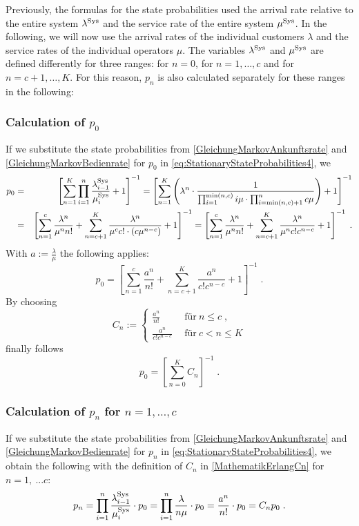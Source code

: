 \documentclass[a4paper,11pt,oneside]{article}
\theoremstyle{definition}
\begin{document}
Previously, the formulas for the state probabilities used the arrival rate relative to the entire system $\lambda^{\rm Sys}$ and the service rate of the entire system $\mu^{\rm Sys}$. In the following, we will now use the arrival rates of the individual customers $\lambda$ and the service rates of the individual operators $\mu$. The variables $\lambda^{\rm Sys}$ and $\mu^{\rm Sys}$ are defined differently for three ranges: for $n=0$, for $n=1,\ldots,c$ and for $n=c+1,\ldots,K$. For this reason, $p_n$ is also calculated separately for these ranges in the following:

\subsubsection*{Calculation of $p_0$}

If we substitute the state probabilities from \eqref{GleichungMarkovAnkunftsrate} and \eqref{GleichungMarkovBedienrate} for $p_0$ in \eqref{eq:StationaryStateProbabilities4}, we
\begin{eqnarray*}
p_0&=&
\left[\sum_{n=1}^K\prod_{i=1}^n\frac{\lambda_{i-1}^{\rm Sys}}{\mu_i^{\rm Sys}}+1\right]^{-1} =
\left[\sum_{n=1}^K\left(
\lambda^n\cdot\frac{1}{\prod_{i=1}^{\min(n,c)}i\mu\cdot\prod_{i=\min(n,c)+1}^nc\mu}
\right)+1\right]^{-1}\\&=&
\left[\sum_{n=1}^c\frac{\lambda^n}{\mu^nn!}+\sum_{n=c+1}^K\frac{\lambda^n}{\mu^cc!\cdot(c\mu^{n-c})}+1\right]^{-1} =
\left[\sum_{n=1}^c\frac{\lambda^n}{\mu^nn!}+\sum_{n=c+1}^K\frac{\lambda^n}{\mu^nc!c^{n-c}}+1\right]^{-1}\;.
\end{eqnarray*}
With $a:=\frac{\lambda}{\mu}$ the following applies:
$$
p_0=
\left[\sum_{n=1}^c\frac{a^n}{n!}+\sum_{n=c+1}^K\frac{a^n}{c!c^{n-c}}+1\right]^{-1}\;.
$$
By choosing
\begin{equation}\label{MathematikErlangCn}
C_n:=\left\{\begin{array}{ll}
\displaystyle \frac{a^n}{n!}&~~\textrm{für}~n\le c\;,\\
\displaystyle \frac{a^n}{c!c^{n-c}}&~~\textrm{für}~c<n\le K
\end{array}\right.
\end{equation}
finally follows
$$
p_0=\left[\sum_{n=0}^KC_n\right]^{-1}\;.
$$

\subsubsection*{Calculation of $p_n$ for $n=1,\ldots,c$}

If we substitute the state probabilities from \eqref{GleichungMarkovAnkunftsrate} and \eqref{GleichungMarkovBedienrate} for $p_n$ in \eqref{eq:StationaryStateProbabilities4}, we obtain the following with the definition of $C_n$ in \eqref{MathematikErlangCn} for $n=1,\ ...c$:
$$
p_n=
\prod_{i=1}^n\frac{\lambda_{i-1}^{\rm Sys}}{\mu_i^{\rm Sys}}\cdot p_0=
\prod_{i=1}^n\frac{\lambda}{n\mu}\cdot p_0=
\frac{a^n}{n!}\cdot p_0=
C_np_0\;.
$$
\end{document}
